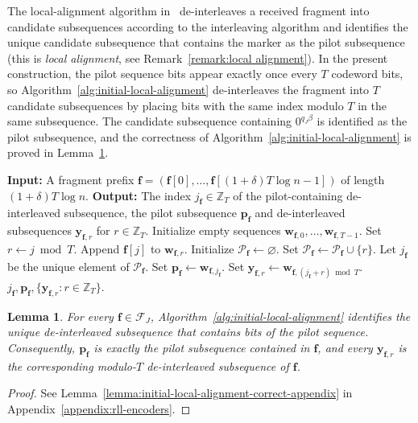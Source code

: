 \documentclass[journal,letterpaper,onecolumn,11pt]{IEEEtran}
\newcommand{\bZ}{\mathbb{Z}}
\newcommand{\cF}{\mathcal{F}}
\newcommand{\cP}{\mathcal{P}}
\newcommand{\boldf}{\mathbf{f}}
\newcommand{\boldp}{\mathbf{p}}
\newcommand{\boldw}{\mathbf{w}}
\newcommand{\boldy}{\mathbf{y}}
\newtheorem{lemma}{Lemma}
\begin{document}
The local-alignment algorithm in~\cite[Algorithm~1]{liu2026improved}
de-interleaves a received fragment into candidate subsequences according to the interleaving algorithm and identifies the unique candidate subsequence that contains the marker as the pilot subsequence (this is \textit{local alignment}, see Remark~\ref{remark:local alignment}).
In the present construction, the pilot sequence bits appear exactly once every \(T\) codeword bits, so Algorithm~\ref{alg:initial-local-alignment} de-interleaves the fragment into \(T\) candidate subsequences by placing bits with the same index modulo \(T\) in the same subsequence. 
The candidate subsequence containing \(0^{q_J\beta}\) is identified as the pilot subsequence, and the correctness of
Algorithm~\ref{alg:initial-local-alignment} is proved in
Lemma~\ref{lemma:initial-local-alignment-correct}.
\begin{algorithm}[H]
\caption{Initial local alignment by marker detection}
\label{alg:initial-local-alignment}
\begin{algorithmic}[1]
\STATE \textbf{Input:} A fragment prefix
\(\boldf=(\boldf[0],\ldots,\boldf[(1+\delta)T\log n-1])\) of length
\((1+\delta)T\log n\).
\STATE \textbf{Output:} The index \(j_{\boldf}\in\bZ_T\) of the
pilot-containing de-interleaved subsequence, the pilot subsequence
\(\boldp_{\boldf}\) and de-interleaved subsequences
\(\boldy_{\boldf,r}\) for \(r\in\bZ_T\).
\STATE Initialize empty sequences
\(\boldw_{\boldf,0},\ldots,\boldw_{\boldf,T-1}\).
    \STATE Set \(r\gets j\bmod T\).
    \STATE Append \(\boldf[j]\) to \(\boldw_{\boldf,r}\).
\ENDFOR
\STATE Initialize \(\cP_{\boldf}\gets\varnothing\).
    \IF{\(\boldw_{\boldf,r}\) contains a run \(0^{q_J\beta}\)}\label{line:marker test}
        \STATE Set
        \(\cP_{\boldf}\gets\cP_{\boldf}\cup\{r\}\).
    \ENDIF
\ENDFOR
\STATE Let \(j_{\boldf}\) be the unique element of \(\cP_{\boldf}\).
\STATE Set
\(\boldp_{\boldf}\gets\boldw_{\boldf,j_{\boldf}}\).
    \STATE Set
    \(\boldy_{\boldf,r}
    \gets\boldw_{\boldf,(j_{\boldf}+r)\bmod T}\).
\ENDFOR
\RETURN
\(j_{\boldf},\boldp_{\boldf},
\{\boldy_{\boldf,r}:r\in\bZ_T\}\).
\end{algorithmic}
\end{algorithm}

\begin{lemma}\label{lemma:initial-local-alignment-correct}
For every \(\boldf\in\cF_J\),
Algorithm~\ref{alg:initial-local-alignment} identifies the unique
de-interleaved subsequence that contains bits of the pilot sequence.
Consequently, \(\boldp_{\boldf}\) is exactly the pilot subsequence contained in \(\boldf\), and every \(\boldy_{\boldf,r}\) is the corresponding modulo-\(T\) de-interleaved subsequence of \(\boldf\).
\end{lemma}
\begin{proof}
See Lemma~\ref{lemma:initial-local-alignment-correct-appendix} in Appendix~\ref{appendix:rll-encoders}.
\end{proof}
\end{document}
